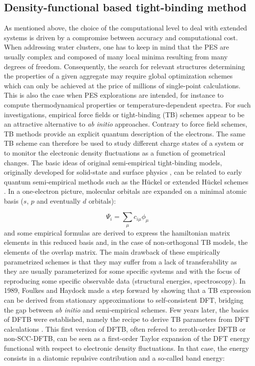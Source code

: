 \documentclass[]{interact}
\theoremstyle{plain}%
\theoremstyle{definition}
\theoremstyle{remark}
\begin{document}
\subsection{Density-functional based tight-binding method}

As mentioned above, the choice of the computational level to deal with extended systems is driven by a compromise between  accuracy and computational cost. When addressing water clusters, one has to keep in mind that the PES are usually complex and composed of many local minima resulting from many
degrees of freedom. Consequently, the search for relevant structures determining the properties of a given aggregate may require global optimization
schemes which can only be achieved at the price of millions of single-point calculations. This is also the case when PES explorations are intended, for instance to compute thermodynamical properties or temperature-dependent spectra. For such investigations, empirical force fields or tight-binding (TB) schemes appear to be an attractive alternative to {\it ab initio} approaches. Contrary to force field schemes,
TB methods provide an explicit quantum description of the electrons. The same TB scheme can therefore be used
to study different charge states of a system or to monitor the electronic density fluctuations as a function of geometrical changes. The basic ideas of original semi-empirical tight-binding models, originally developed for solid-state and surface physics \cite{chadi,harrison,friedel,desjonquere,noguera},
can be related to early quantum semi-empirical methods such as the H\"uckel \cite{huckel} or extended H\"uckel schemes \cite{wolfsberg52,hoffman63,hoffman64a,hoffman66}. In a one-electron picture, molecular orbitals are expanded on a minimal atomic basis ($s$, $p$ and eventually $d$ orbitals):

\begin{equation}
\Psi_i = \sum_\mu c_{i\mu} \phi_\mu
\label{LCAO}
\end{equation}
and some empirical formulas are derived to express the hamiltonian matrix elements in this reduced basis and, in the case of
non-orthogonal TB models, the elements of the overlap matrix. The main drawback of these empirically parametrized schemes
is that they may suffer from a lack of transferability as they are usually parameterized for some specific systems and with the
focus of reproducing some specific observable data (structural energies, spectroscopy). In 1989, Foulkes and Haydock \cite{foulkes}
made a step forward by showing that a TB expression can be derived from stationary approximations to self-consistent DFT, bridging
the gap between  {\it ab initio}  and semi-empirical  schemes. Few years later, the basics of DFTB  were established, namely the recipe
to derive TB parameters from DFT calculations \cite{dftb1,dftb2}. This first version of DFTB, often refered to zeroth-order DFTB or non-SCC-DFTB, can be seen as a first-order Taylor expansion of the DFT energy functional with respect to electronic density fluctuations. In that case, the energy consists
in a  diatomic repulsive contribution  and a so-called band energy:
 
\end{document}
